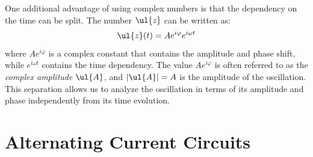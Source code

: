 One additional advantage of using complex numbers is that the dependency on the time can be split. The number $\ul{z}$ can be written as:
\begin{equation*}
    \ul{z}(t) = A e^{i\varphi} e^{i\omega t}
\end{equation*}
where $A e^{i\varphi}$ is a complex constant that contains the amplitude and phase shift, while $e^{i\omega t}$ contains the time dependency. The value $A e^{i\varphi}$ is often referred to as the \textit{complex amplitude} $\ul{A}$, and $|\ul{A}|=A$ is the amplitude of the oscillation. This separation allows us to analyze the oscillation in terms of its amplitude and phase independently from its time evolution.

\section{Alternating Current Circuits}

